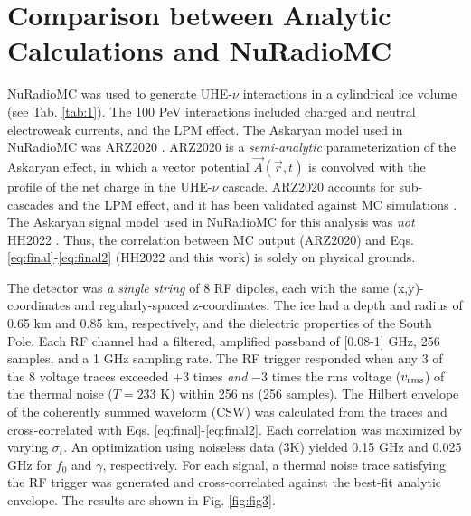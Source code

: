 \documentclass[amsmath,amssymb,aps,prd,10pt,twocolumn,showkeys]{revtex4}
\begin{document}
\section{Comparison between Analytic Calculations and NuRadioMC}
\label{sec:sim}

NuRadioMC was used to generate UHE-$\nu$ interactions in a cylindrical ice volume (see Tab. \ref{tab:1}).  The 100 PeV interactions included charged and neutral electroweak currents, and the LPM effect.  The Askaryan model used in NuRadioMC was ARZ2020 \cite{PhysRevD.101.083005}.  ARZ2020 is a \textit{semi-analytic} parameterization of the Askaryan effect, in which a vector potential $\vec{A}(\vec{r},t)$ is convolved with the profile of the net charge in the UHE-$\nu$ cascade.  ARZ2020 accounts for sub-cascades and the LPM effect, and it has been validated against MC simulations \cite{zhs,10.1103/physrevd.84.103003}.  The Askaryan signal model used in NuRadioMC for this analysis was \textit{not} HH2022 \cite{PhysRevD.105.123019}.  Thus, the correlation between MC output (ARZ2020) and Eqs. \ref{eq:final}-\ref{eq:final2} (HH2022 and this work) is solely on physical grounds.

The detector was \textit{a single string} of 8 RF dipoles, each with the same (x,y)-coordinates and regularly-spaced z-coordinates.  The ice had a depth and radius of 0.65 km and 0.85 km, respectively, and the dielectric properties of the South Pole.  Each RF channel had a filtered, amplified passband of [0.08-1] GHz, 256 samples, and a 1 GHz sampling rate.  The RF trigger responded when any 3 of the 8 voltage traces exceeded $+3$ times \textit{and} $-3$ times the rms voltage ($v_{\rm rms}$) of the thermal noise ($T=233$ K) within 256 ns (256 samples).  The Hilbert envelope of the coherently summed waveform (CSW) was calculated from the traces and cross-correlated with Eqs. \ref{eq:final}-\ref{eq:final2}.  Each correlation was maximized by varying $\sigma_t$.  An optimization using noiseless data (3K) yielded 0.15 GHz and 0.025 GHz for $f_0$ and $\gamma$, respectively.  For each signal, a thermal noise trace satisfying the RF trigger was generated and cross-correlated against the best-fit analytic envelope.  The results are shown in Fig. \ref{fig:fig3}.
\end{document}
